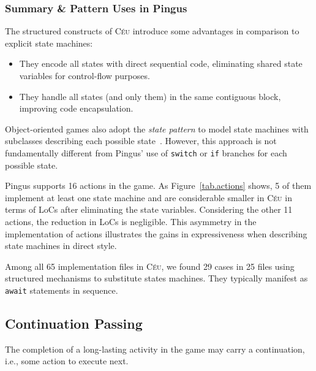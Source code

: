 \documentclass{vgtc}                          %
\newcommand{\CEU}{\textsc{C\'{e}u}\xspace}
\newcommand{\code}[1] {{\small{\texttt{#1}}}}
\begin{document}
\subsubsection{Summary \& Pattern Uses in Pingus}

The structured constructs of \CEU introduce some advantages in comparison to 
explicit state machines:
%
\begin{itemize}
\item They encode all states with direct sequential code, eliminating shared
      state variables for control-flow purposes.
\item They handle all states (and only them) in the same contiguous block,
      improving code encapsulation.
\end{itemize}
%
Object-oriented games also adopt the \emph{state pattern} to model state
machines with subclasses describing each possible state~\cite{games.patterns}.
However, this approach is not fundamentally different from Pingus' use of
\code{switch} or \code{if} branches for each possible state.

Pingus supports 16 actions in the game.
As Figure~\ref{tab.actions} shows, 5 of them implement at least one state
machine and are considerable smaller in \CEU in terms of LoCs after eliminating
the state variables.
%
Considering the other 11 actions, the reduction in LoCs is negligible.
This asymmetry in the implementation of actions illustrates the gains in
expressiveness when describing state machines in direct style.


Among all 65 implementation files in \CEU, we found 29 cases in 25 files using
structured mechanisms to substitute states machines.
They typically manifest as \code{await} statements in sequence.

\subsection{Continuation Passing}
\label{sec.pats.cps}

    The completion of a long-lasting activity in the game may carry a
    continuation, i.e., some action to execute next.
\end{document}
